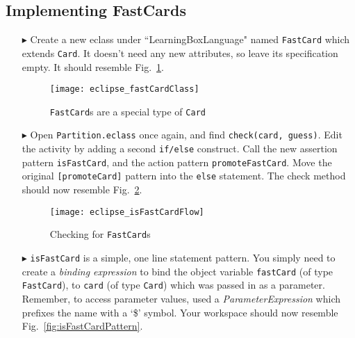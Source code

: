 \newpage
\subsection{Implementing FastCards}
\texHeader
\hypertarget{fastCard tex}{}

\begin{itemize}
  
\item[$\blacktriangleright$] Create a new eclass under ``LearningBoxLanguage" named
\texttt{FastCard} which extends \texttt{Card}. It doesn't need any new attributes, so leave its specification empty. It should resemble
Fig.~\ref{fig:fastClass}.

\vspace{0.5cm}

\begin{figure}[htp]
\begin{center}
  \texttt{[image: eclipse\_fastCardClass]}
  \caption{\texttt{FastCard}s are a special type of \texttt{Card}}
  \label{fig:fastClass}
\end{center}
\end{figure}

\item[$\blacktriangleright$] Open \texttt{Partition.eclass} once again, and find \texttt{check(card, guess)}. Edit the activity by adding a second
\texttt{if/else} construct. Call the new assertion pattern \texttt{isFastCard}, and the action pattern \texttt{promoteFastCard}. Move the original
\texttt{[promoteCard]} pattern into the \texttt{else} statement. The check method should now resemble Fig.~\ref{fig:isFastCard}.

\vspace{0.5cm}

\begin{figure}[htp]
\begin{center}
  \texttt{[image: eclipse\_isFastCardFlow]}
  \caption{Checking for \texttt{FastCard}s}
  \label{fig:isFastCard}
\end{center}
\end{figure}

\item[$\blacktriangleright$] \texttt{isFastCard} is a simple, one line statement pattern. You simply need to create a \emph{binding expression} to bind the
object variable \texttt{fastCard} (of type \texttt{FastCard}), to \texttt{card} (of type \texttt{Card}) which was passed in as a parameter. Remember, to access
parameter values, used a \emph{ParameterExpression} which prefixes the name with a `\$' symbol. Your workspace should now resemble
Fig.~\ref{fig:isFastCardPattern}.


\end{itemize}
